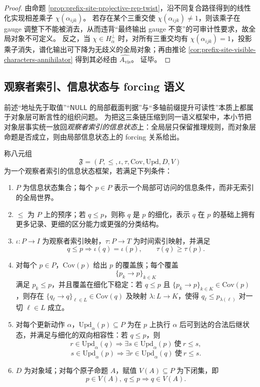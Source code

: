 \begin{proof}
由命题 \ref{prop:prefix-site-projective-rep-twist}，沿不同复合路径得到的线性化实现相差乘子 \(\chi(\alpha_{ijk})\)。
若存在某个三重交使 \(\chi(\alpha_{ijk})\neq 1\)，则该乘子在 gauge 调整下不能被消去，从而违背“最终输出 gauge 不变”的可审计性要求，故全局对象不可定义。
反之，当 \(\chi\in H_\alpha^\perp\) 时，对所有三重交均有 \(\chi(\alpha_{ijk})=1\)，投影乘子消失，谱化输出可下降为无歧义的全局对象；再由推论 \ref{cor:prefix-site-visible-characters-annihilator} 得到其必经由 \(\widehat{A_{\mathrm{vis}}}\)。
证毕。
\end{proof}

\subsection{观察者索引、信息状态与 forcing 语义}\label{subsec:observer-indexed-forcing}
前述“地址先于取值”“\(\mathsf{NULL}\) 的局部截面判据”与“多轴前缀提升可读性”本质上都属于对象层可断言性的组织问题。
为把这三条链压缩到同一语义框架中，本小节把对象层事实统一放回\emph{观察者索引的信息状态}上：全局层只保留推理规则，而对象层命题是否成立，则由局部信息状态上的 forcing 关系给出。

\begin{definition}[观察者索引的信息状态框架]\label{def:observer-indexed-information-frame}
称八元组
\[
\mathfrak F=(P,\le,\iota,\tau,\mathrm{Cov},\mathrm{Upd},D,V)
\]
为一个观察者索引的信息状态框架，若满足下列条件：
\begin{enumerate}
  \item \(P\) 为信息状态集合；每个 \(p\in P\) 表示一个局部可访问的信息条件，而非无索引的全局世界。
  \item \(\le\) 为 \(P\) 上的预序；若 \(q\le p\)，则称 \(q\) 是 \(p\) 的细化，表示 \(q\) 在 \(p\) 的基础上拥有更多记录、更细的区分能力或更强的分类结构。
  \item \(\iota:P\to I\) 为观察者索引映射，\(\tau:P\to T\) 为时间索引映射，并满足
  \[
  q\le p \Longrightarrow \iota(q)=\iota(p),\qquad \tau(q)\ge \tau(p).
  \]
  \item 对每个 \(p\in P\)，\(\mathrm{Cov}(p)\) 给出 \(p\) 的覆盖族；每个覆盖
  \[
  \{p_k\to p\}_{k\in K}
  \]
  满足 \(p_k\le p\)，并且覆盖在细化下稳定：若 \(q\le p\) 且 \(\{p_k\to p\}_{k\in K}\in\mathrm{Cov}(p)\)，则存在 \(\{q_\ell\to q\}_{\ell\in L}\in\mathrm{Cov}(q)\) 及映射 \(\lambda:L\to K\)，使得 \(q_\ell\le p_{\lambda(\ell)}\) 对一切 \(\ell\in L\) 成立。
  \item 对每个更新动作 \(\alpha\)，\(\mathrm{Upd}_\alpha(p)\subseteq P\) 为在 \(p\) 上执行 \(\alpha\) 后可到达的合法后继状态，并满足与细化的双向相容性：若 \(q\le p\)，则
  \[
  r\in \mathrm{Upd}_\alpha(q)\Rightarrow \exists s\in \mathrm{Upd}_\alpha(p)\ \text{使}\ r\le s,
  \]
  \[
  s\in \mathrm{Upd}_\alpha(p)\Rightarrow \exists r\in \mathrm{Upd}_\alpha(q)\ \text{使}\ r\le s.
  \]
  \item \(D\) 为对象域；对每个原子命题 \(A\)，赋值 \(V(A)\subseteq P\) 为下闭集，即
  \[
  p\in V(A),\ q\le p \Longrightarrow q\in V(A).
  \]
\end{enumerate}
\end{definition}

